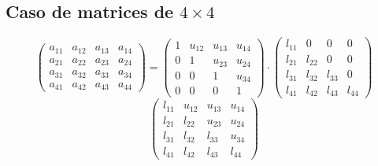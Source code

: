 \documentclass[10pt,a4paper,dvipdfmx]{article}
\begin{document}
\subsection{Caso de matrices de $4\times 4$ }
$$ \left( 
\begin{array}{cccc}
a_{{1}{1}} & a_{{1}{2}} & a_{{1}{3}} & a_{{1}{4}} \\
a_{{2}{1}} & a_{{2}{2}} & a_{{2}{3}} & a_{{2}{4}} \\
a_{{3}{1}} & a_{{3}{2}} & a_{{3}{3}} & a_{{3}{4}} \\
a_{{4}{1}} & a_{{4}{2}} & a_{{4}{3}} & a_{{4}{4}} 
 \end{array}
\right)
 = \left( 
\begin{array}{cccc}
1 & u_{{1}{2}} & u_{{1}{3}} & u_{{1}{4}} \\
0 & 1 & u_{{2}{3}} & u_{{2}{4}} \\
0 & 0 & 1 & u_{{3}{4}} \\
0 & 0 & 0 & 1 
 \end{array}
\right)
 \cdot \left( 
\begin{array}{cccc}
l_{{1}{1}} & 0 & 0 & 0 \\
l_{{2}{1}} & l_{{2}{2}} & 0 & 0 \\
l_{{3}{1}} & l_{{3}{2}} & l_{{3}{3}} & 0 \\
l_{{4}{1}} & l_{{4}{2}} & l_{{4}{3}} & l_{{4}{4}} 
 \end{array}
\right)
 $$
$$ \left( 
\begin{array}{cccc}
l_{{1}{1}} & u_{{1}{2}} & u_{{1}{3}} & u_{{1}{4}} \\
l_{{2}{1}} & l_{{2}{2}} & u_{{2}{3}} & u_{{2}{4}} \\
l_{{3}{1}} & l_{{3}{2}} & l_{{3}{3}} & u_{{3}{4}} \\
l_{{4}{1}} & l_{{4}{2}} & l_{{4}{3}} & l_{{4}{4}} 
 \end{array}
\right)
 $$
\end{document}
